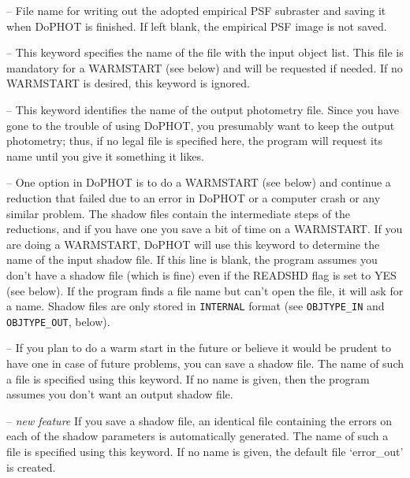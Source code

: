  -- File name for writing out the adopted 
empirical PSF subraster and saving it when DoPHOT is finished.
If left blank, the empirical PSF image is not saved.

 -- This keyword specifies the name of
the file with the input object list.  This file is mandatory 
for a WARMSTART (see below) and will be requested if needed. 
If no WARMSTART is desired, this keyword is ignored.

 -- This keyword identifies the name
of the output photometry file.  Since you have gone to the
trouble of using DoPHOT, you
presumably want to keep the output photometry; thus, if no legal file is 
specified here, the program will request its name until you
give it something it likes. 

 -- One option in DoPHOT is to 
do a WARMSTART (see below) and continue a reduction that 
failed due to an error in DoPHOT or a computer crash or
any similar problem.  The shadow files contain the intermediate
steps of the reductions, and if you have one you save a bit
of time on a WARMSTART.  If you are doing a WARMSTART, DoPHOT
will use this keyword to determine the name of the input
shadow file.  If this line is blank, the program assumes you 
don't have a shadow file (which is fine) even if the READSHD
flag is set to YES (see below).   If the program
finds a file name but can't open the file, it will ask for 
a name.  Shadow files are only stored in {\tt INTERNAL} format
(see {\tt OBJTYPE\_IN} and {\tt OBJTYPE\_OUT}, below).

 --  If you plan to do a warm
start in the future or believe it would be prudent to have one
in case of future problems, you can save a shadow file.  The name
of such a file 
is specified using this keyword.  If no name is given, then
the program assumes you don't want an output shadow file.

 -- {\it new feature} If you save a 
shadow file, an identical file containing the errors on each of the 
shadow parameters is automatically generated.  The name of such 
a file is specified using this keyword.  If no name is given, the default 
file `error\_out' is created.

